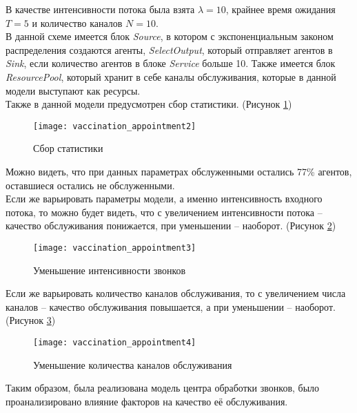 В качестве интенсивности потока была взята $\lambda = 10$, крайнее время ожидания $T = 5$ и количество каналов  $N = 10$.\\

В данной схеме имеется блок \textit{Source}, в котором с экспоненциальным законом распределения создаются агенты, \textit{SelectOutput}, который отправляет агентов в \textit{Sink}, если количество агентов в блоке \textit{Service} больше 10. Также имеется блок \textit{ResourcePool}, который хранит в себе каналы обслуживания, которые в данной модели выступают как ресурсы.\\

Также в данной модели предусмотрен сбор статистики. (Рисунок \ref{fig:vaccination_appointment2})
\begin{figure}[h]
	\centering \texttt{[image: vaccination\_appointment2]}
	\caption{Сбор статистики}
	\label{fig:vaccination_appointment2}
\end{figure}

Можно видеть, что при данных параметрах обслуженными остались 77\% агентов, оставшиеся остались не обслуженными.\\

Если же варьировать параметры модели, а именно интенсивность входного потока, то можно будет видеть, что с увеличением интенсивности потока -- качество обслуживания понижается, при уменьшении -- наоборот. (Рисунок \ref{fig:vaccination_appointment3})\\
\begin{figure}[h]
	\centering \texttt{[image: vaccination\_appointment3]}
	\caption{Уменьшение интенсивности звонков}
	\label{fig:vaccination_appointment3}
\end{figure}

\newpage

Если же варьировать количество каналов обслуживания, то с увеличением числа каналов -- качество обслуживания повышается, а при уменьшении -- наоборот. (Рисунок \ref{fig:vaccination_appointment4})\\
\begin{figure}[h]
	\centering \texttt{[image: vaccination\_appointment4]}
	\caption{Уменьшение количества каналов обслуживания}
	\label{fig:vaccination_appointment4}
\end{figure}

Таким образом, была реализована модель центра обработки звонков, было проанализировано влияние факторов на качество её обслуживания.\\

